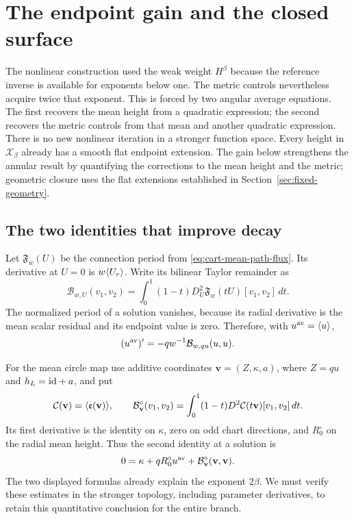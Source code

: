 \section{The endpoint gain and the closed surface}
\label{sec:final-proof}

The nonlinear construction used the weak weight $H^\beta$ because
the reference inverse is available for exponents below one. The
metric controls nevertheless acquire twice that exponent. This is
forced by two angular average equations. The first recovers the mean
height from a quadratic expression; the second recovers the metric
controls from that mean and another quadratic expression. There is
no new nonlinear iteration in a stronger function space.
Every height in $\mathcal X_\beta$ already has a smooth flat endpoint
extension. The gain below strengthens the annular result by
quantifying the corrections to the mean height and the metric;
geometric closure uses the flat extensions established in
Section~\ref{sec:fixed-geometry}.

\subsection{The two identities that improve decay}

Let $\mathfrak F_w(U)$ be the connection period from
\eqref{eq:cart-mean-path-flux}. Its derivative at $U=0$ is
$w\langle U_r\rangle$. Write its bilinear Taylor remainder as
\begin{equation}\label{eq:posterior-period-bilinear}
 \mathcal B_{w,U}(v_1,v_2)
 =\int_0^1(1-t)D_U^2\mathfrak F_w(tU)[v_1,v_2]\,dt.
\end{equation}
The normalized period of a solution vanishes, because its radial
derivative is the mean scalar residual and its endpoint value is
zero. Therefore, with $u^{\rm av}=\langle u\rangle$,
\begin{equation}\label{eq:mean-recovered-derivative}
 (u^{\rm av})'=-q w^{-1}\mathcal B_{w,qu}(u,u).
\end{equation}

For the mean circle map use additive coordinates
$\mathbf v=(Z,\kappa,a)$, where $Z=qu$ and $h_L=\mathrm{id}+a$, and put
\[
 \mathcal C(\mathbf v)=\langle \mathfrak e(\mathbf v)\rangle,
 \qquad
 \mathcal B^\circ_{\mathbf v}(v_1,v_2)
 =\int_0^1(1-t)D^2\mathcal C(t\mathbf v)[v_1,v_2]\,dt.
\]
Its first derivative is the identity on $\kappa$, zero on odd chart
directions, and $R_0^\circ$ on the radial mean height. Thus the
second identity at a solution is
\begin{equation}\label{eq:weak-posterior-control}
 0=\kappa+qR_0^\circ u^{\rm av}
                       +\mathcal B^\circ_{\mathbf v}(\mathbf v,\mathbf v).
\end{equation}
The two displayed formulas already explain the exponent $2\beta$.
We must verify these estimates in the stronger topology, including
parameter derivatives, to retain this quantitative conclusion for
the entire branch.

